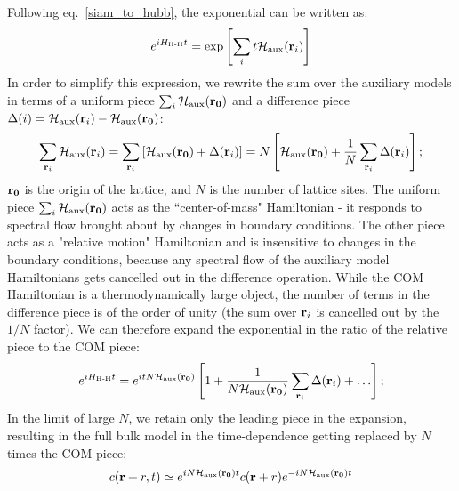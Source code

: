 \documentclass[reprint,hidelinks]{revtex4-2}
\begin{document}
Following eq.~\ref{siam_to_hubb}, the exponential can be written as:
\begin{equation}\begin{aligned}
e^{i H_\text{H-H} t} = \exp\left[\sum_i t\mathcal{H}_\text{aux}({\bf r}_i)\right] 
\end{aligned}\end{equation}
In order to simplify this expression, we rewrite the sum over the auxiliary models in terms of a uniform piece \(\sum_{i}\mathcal{H}_\text{aux}({\bf r_0})\) and a difference piece \(\Delta(i) = \mathcal{H}_\text{aux}({\bf r}_i) - \mathcal{H}_\text{aux}({\bf r_0})\):
\begin{equation}\begin{aligned}
	\sum_{{\bf r}_i} \mathcal{H}_\text{aux}({\bf r}_i) = \sum_{{\bf r}_i} \left[\mathcal{H}_\text{aux}({\bf r_0}) + \Delta({\bf r}_i)\right] = N \left[\mathcal{H}_\text{aux}({\bf r_0}) + \frac{1}{N}\sum_{{\bf r}_i} \Delta({\bf r}_i)\right];
\end{aligned}\end{equation}
\({\bf r_0}\) is the origin of the lattice, and \(N\) is the number of lattice sites. The uniform piece \(\sum_{i}\mathcal{H}_\text{aux}({\bf r_0})\) acts as the ``center-of-mass" Hamiltonian - it responds to spectral flow brought about by changes in boundary conditions. The other piece acts as a "relative motion" Hamiltonian and is insensitive to changes in the boundary conditions, because any spectral flow of the auxiliary model Hamiltonians gets cancelled out in the difference operation. While the COM Hamiltonian is a thermodynamically large object, the number of terms in the difference piece is of the order of unity (the sum over \({\bf r}_i\) is cancelled out by the \(1/N\) factor). We can therefore expand the exponential in the ratio of the relative piece to the COM piece:
\begin{equation}\begin{aligned}
	e^{i H_\text{H-H} t} = e^{i t N \mathcal{H}_\text{aux}({\bf r_0})}\left[1 + \frac{1}{N \mathcal{H}_\text{aux}({\bf r_0})}\sum_{{\bf r}_i} \Delta({\bf r}_i) + \ldots\right];
\end{aligned}\end{equation}
In the limit of large \(N\), we retain only the leading piece in the expansion, resulting in the full bulk model in the time-dependence getting replaced by \(N\) times the COM piece:
\begin{equation}\begin{aligned}
	c({\bf r} + r,t) \simeq e^{i N \mathcal{H}_\text{aux}({\bf r_0}) t}c({\bf r} + r)e^{-i N \mathcal{H}_\text{aux}({\bf r_0}) t}
\end{aligned}\end{equation}
\end{document}
